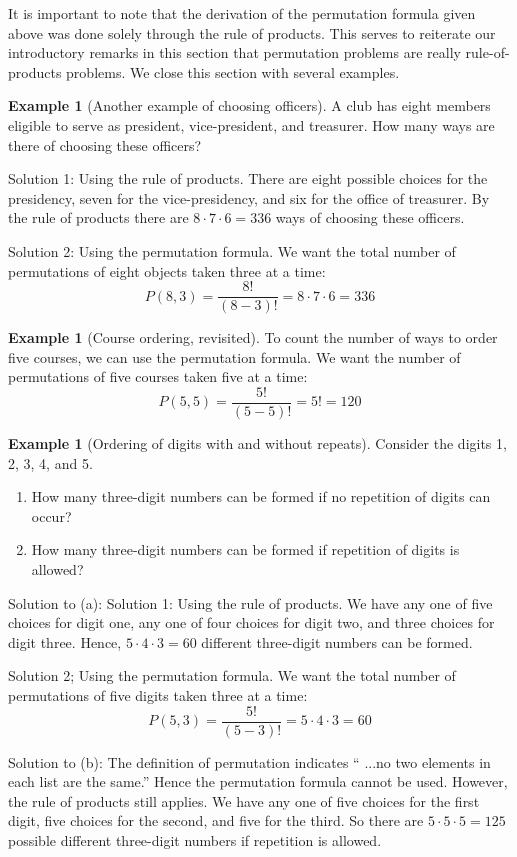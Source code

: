 \documentclass[10pt,]{book}
\theoremstyle{plain}
\theoremstyle{definition}
\newtheorem{example}[theorem]{Example}
\begin{document}
 It is important to note that the derivation of the permutation formula given above was done solely through the rule of products. This serves to reiterate our introductory remarks in this section that permutation problems are really rule-of-products problems.  We close this section with several examples.
%
\begin{example}[Another example of choosing officers]\label{more_club_officers}
A club has eight members eligible to serve as president, vice-president, and treasurer. How many ways are there of choosing these officers?
%
\par

 Solution 1: Using the rule of products. There are eight possible choices for the presidency, seven for the vice-presidency, and six for the office of treasurer. By the rule of products there are \(8 \cdot 7\cdot 6 = 336\) ways of choosing these officers.
%
\par

 Solution 2: Using the permutation formula. We want the total number of permutations of eight objects taken three at a time:
 	\[P(8,3)=\frac{8!}{(8-3)!}=8 \cdot 7 \cdot 6 = 336\]
%
\end{example}
\begin{example}[Course ordering, revisited]\label{course-ordering-revisited}
To count the number of ways to order five courses, we can use the permutation formula. We want the number of permutations of five courses taken five at a time:
\[P(5,5)= \frac{5!}{(5-5)!}= 5!= 120\]\end{example}
\begin{example}[Ordering of digits with and without repeats]\label{ordering-digits}
Consider the digits 1, 2, 3, 4, and 5.
\leavevmode%
\begin{enumerate}
\item\hypertarget{li-210}{} How many three-digit numbers can be formed if no repetition of digits can occur?\item\hypertarget{li-211}{} How many three-digit numbers can be formed if repetition of digits is allowed?\end{enumerate}

%
\par

 Solution to (a): Solution 1: Using the rule of products. We have any one of five choices for digit one, any one of four choices for digit two, and three choices for digit three. Hence, \(5 \cdot 4 \cdot 3 = 60\) different three-digit numbers can be formed.
%
\par
Solution 2; Using the permutation formula. We want the total number of permutations of five digits taken three at a time:
 \[P(5,3)=\frac{5!}{(5-3)!}=5 \cdot 4 \cdot 3 = 60\]%
\par
Solution to (b): The definition of permutation indicates `` ...no two elements in each list are the same.'' Hence the permutation formula cannot be used. However, the rule of products still applies. We have any one of five choices for the first digit, five choices for the second, and five for the third. So there are \(5 \cdot 5\cdot 5 = 125\) possible different three-digit numbers if repetition is allowed.%
\end{example}
\end{document}
